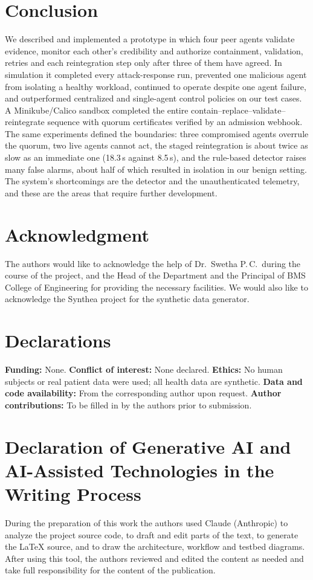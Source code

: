 \documentclass[journal]{IEEEtran}
\begin{document}
\section{Conclusion}
We described and implemented a prototype in which four peer agents validate evidence, monitor each other's credibility and authorize containment, validation, retries and each reintegration step only after three of them have agreed. In simulation it completed every attack-response run, prevented one malicious agent from isolating a healthy workload, continued to operate despite one agent failure, and outperformed centralized and single-agent control policies on our test cases. A Minikube/Calico sandbox completed the entire contain--replace--validate--reintegrate sequence with quorum certificates verified by an admission webhook. The same experiments defined the boundaries: three compromised agents overrule the quorum, two live agents cannot act, the staged reintegration is about twice as slow as an immediate one (18.3\,s against 8.5\,s), and the rule-based detector raises many false alarms, about half of which resulted in isolation in our benign setting. The system's shortcomings are the detector and the unauthenticated telemetry, and these are the areas that require further development.

\section*{Acknowledgment}
The authors would like to acknowledge the help of Dr.\ Swetha P.\,C.\ during the course of the project, and the Head of the Department and the Principal of BMS College of Engineering for providing the necessary facilities. We would also like to acknowledge the Synthea project for the synthetic data generator.

\section*{Declarations}
\textbf{Funding:} None. \textbf{Conflict of interest:} None declared. \textbf{Ethics:} No human subjects or real patient data were used; all health data are synthetic. \textbf{Data and code availability:} From the corresponding author upon request. \textbf{Author contributions:} To be filled in by the authors prior to submission.

\section*{Declaration of Generative AI and AI-Assisted Technologies in the Writing Process}
During the preparation of this work the authors used Claude (Anthropic) to analyze the project source code, to draft and edit parts of the text, to generate the LaTeX source, and to draw the architecture, workflow and testbed diagrams. After using this tool, the authors reviewed and edited the content as needed and take full responsibility for the content of the publication.
\end{document}
